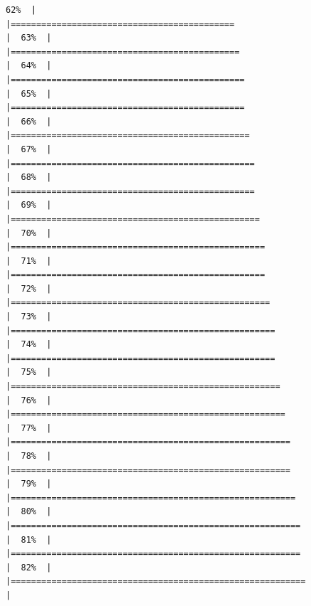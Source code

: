 \documentclass[
]{article}
\begin{document}
\begin{verbatim}
62%  |                                                                              |============================================                          |  63%  |                                                                              |=============================================                         |  64%  |                                                                              |==============================================                        |  65%  |                                                                              |==============================================                        |  66%  |                                                                              |===============================================                       |  67%  |                                                                              |================================================                      |  68%  |                                                                              |================================================                      |  69%  |                                                                              |=================================================                     |  70%  |                                                                              |==================================================                    |  71%  |                                                                              |==================================================                    |  72%  |                                                                              |===================================================                   |  73%  |                                                                              |====================================================                  |  74%  |                                                                              |====================================================                  |  75%  |                                                                              |=====================================================                 |  76%  |                                                                              |======================================================                |  77%  |                                                                              |=======================================================               |  78%  |                                                                              |=======================================================               |  79%  |                                                                              |========================================================              |  80%  |                                                                              |=========================================================             |  81%  |                                                                              |=========================================================             |  82%  |                                                                              |==========================================================            |  
\end{verbatim}
\end{document}
